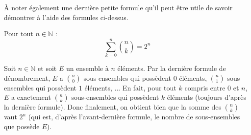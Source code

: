 	\begin{nosummary}
		À noter également une dernière petite formule qu'il peut être utile de savoir démontrer à l'aide des formules ci-dessus.

		\begin{formula}
			Pour tout $n \in \mathbb{N}$ :
			\[ \sum_{k = 0}^n \binom{n}{k} = 2^n \]
		\end{formula}

		\begin{demonstration}
			Soit $n \in \mathbb{N}$ et soit $E$ un ensemble à $n$ éléments.
			\newpar
			Par la dernière formule de dénombrement, $E$ a $\binom{n}{0}$ sous-ensembles qui possèdent $0$ éléments, $\binom{n}{1}$ sous-ensembles qui possèdent $1$ éléments, ...
			\newpar
			En fait, pour tout $k$ compris entre $0$ et $n$, $E$ a exactement $\binom{n}{k}$ sous-ensembles qui possèdent $k$ éléments (toujours d'après la dernière formule).
			\newpar
			Donc finalement, on obtient bien que la somme des $\binom{n}{k}$ vaut $2^n$ (qui est, d'après l'avant-dernière formule, le nombre de sous-ensembles que possède $E$).
		\end{demonstration}
	\end{nosummary}

